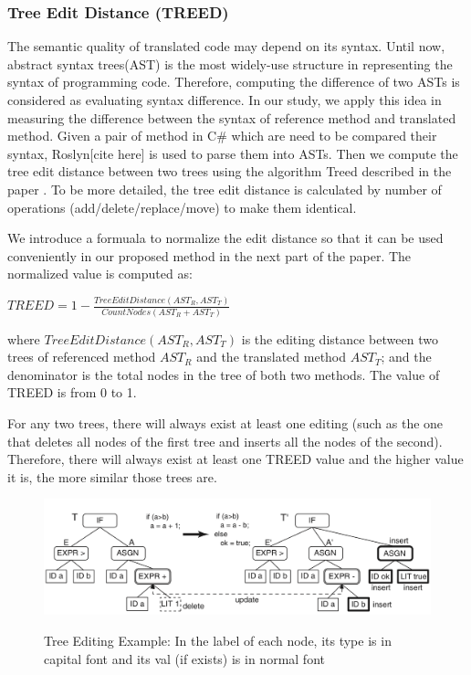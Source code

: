 \subsubsection{\textbf{Tree Edit Distance (TREED)}}  
The semantic quality of translated code may depend on its syntax. Until now, abstract syntax trees(AST) is the most widely-use structure in representing the syntax of programming code. Therefore, computing the difference of two ASTs is considered as evaluating syntax difference.
In our study, we apply this idea in measuring the difference between the syntax of reference method and translated method. Given a pair of method in C\# which are need to be compared their syntax, Roslyn[cite here] is used to parse them into ASTs. Then we compute the tree edit distance between two trees using the algorithm Treed described in the paper \cite{algorithm}.
To be more detailed, the tree edit distance is calculated by number of operations (add/delete/replace/move) to make them identical. 

We introduce a formuala to normalize the edit distance so that it can be used conveniently in our proposed method in the next part of the paper. The normalized value is computed as:

  $TREED = 1 -  \frac{TreeEditDistance\left(AST_R, AST_T\right)}{CountNodes \left(AST_R+AST_T\right)}$ 
  
where $TreeEditDistance\left(AST_R, AST_T\right)$ is the editing distance between two trees of referenced method $AST_R$ and the translated method $AST_T$; and the denominator is the total nodes in the tree of both two methods. The value of TREED is from 0 to 1. 

For any two trees, there will always exist at least one editing (such as the one that deletes all nodes of the first tree and inserts all the nodes of the second). Therefore, there will always exist at least one TREED value and the higher value it is, the more similar those trees are.

\begin{figure}[h]
	\caption{Tree Editing Example: In the label of each node, its type is in capital font and its val (if exists) is in normal font}
	\includegraphics[scale=0.3]{img/treed.png}
	\centering
	\label{fig:treed}
\end{figure}

